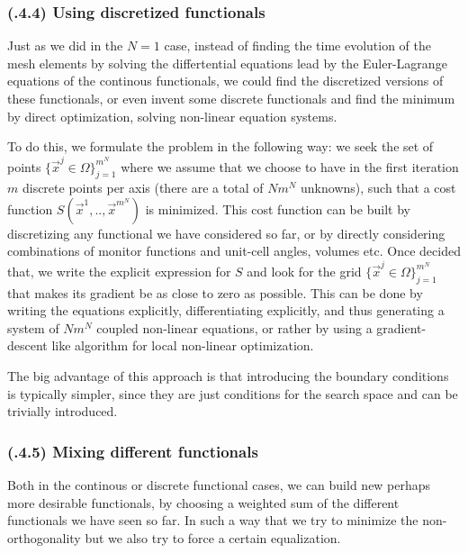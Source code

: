 \documentclass[11pt, a4paper]{article} %
\begin{document}
\subsubsection*{\bf (\textgamma.4.4) Using discretized functionals}

Just as we did in the $N=1$ case, instead of finding the time evolution of the mesh elements by solving the differtential equations lead by the Euler-Lagrange equations of the continous functionals, we could find the discretized versions of these functionals, or even invent some discrete functionals and find the minimum by direct optimization, solving non-linear equation systems.

To do this, we formulate the problem in the following way: we seek the set of points $\{\vec{x}^j\in \Omega\}_{j=1}^{m^N}$ where we assume that we choose to have in the first iteration $m$ discrete points per axis (there are a total of $Nm^N$ unknowns), such that a cost function $S(\vec{x}^1,..,\vec{x}^{m^N})$ is minimized. This cost function can be built by discretizing any functional we have considered so far, or by directly considering combinations of monitor functions and unit-cell angles, volumes etc. Once decided that, we write the explicit expression for $S$ and look for the grid $\{\vec{x}^j\in \Omega\}_{j=1}^{m^N}$ that makes its gradient be as close to zero as possible. This can be done by writing the equations explicitly, differentiating explicitly, and thus generating a system of $Nm^N$ coupled non-linear equations, or rather by using a gradient-descent like algorithm for local non-linear optimization.

The big advantage of this approach is that introducing the boundary conditions is typically simpler, since they are just conditions for the search space and can be trivially introduced.

\subsubsection*{\bf (\textgamma.4.5) Mixing different functionals}
Both in the continous or discrete functional cases, we can build new perhaps more desirable functionals, by choosing a weighted sum of the different functionals we have seen so far. In such a way that we try to minimize the non-orthogonality but we also try to force a certain equalization.




\end{document}
